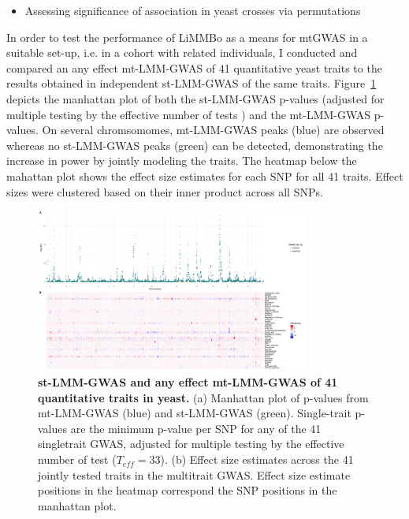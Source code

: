 \begin{itemize}
\item Assessing significance of association in yeast crosses via permutations \citep{Brehm2004, Ehrenreich2010}
\end{itemize} 
 
In order to test the performance of LiMMBo as a means for mtGWAS in a suitable set-up, i.e. in a cohort with related individuals, I conducted and compared an any effect mt-LMM-GWAS of 41 quantitative yeast traits to the results obtained in independent st-LMM-GWAS of the same traits. Figure~\ref{fig:GWAS-yeast} depicts the manhattan plot of both the st-LMM-GWAS p-values (adjusted for multiple testing by the effective number of tests \citep{Galwey2009}) and the mt-LMM-GWAS p-values. On several chromsomomes, mt-LMM-GWAS peaks (blue) are observed whereas no st-LMM-GWAS peaks (green) can be detected, demonstrating the increase in power by jointly modeling the traits. The heatmap below the mahattan plot shows the effect size estimates for each SNP for all 41 traits. Effect sizes were clustered based on their inner product across all SNPs. 
  \begin{figure}[hbtp]
	\centering
	\includegraphics[trim = 0mm 0mm 0mm 0mm, clip, width=0.8\textwidth]{Chapter1/Figures/ManhattanEffectsizes.pdf}
	\caption[st-LMM-GWAS and any effect mt-LMM-GWAS of 41 quantitative traits in yeast]{\textbf{st-LMM-GWAS and any effect mt-LMM-GWAS of 41 quantitative traits in yeast.} (a) Manhattan plot of p-values from mt-LMM-GWAS (blue) and st-LMM-GWAS (green). Single-trait p-values are the minimum p-value per SNP for any of the 41 singletrait GWAS, adjusted for multiple testing by the effective number of test (\(T_{eff}=33\)). (b) Effect size estimates across the 41 jointly tested traits in the multitrait GWAS. Effect size estimate positions in the heatmap correspond the SNP positions in the manhattan plot.}
 	\label{fig:GWAS-yeast}
 	\end{figure}

